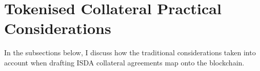 \section{Tokenised Collateral Practical Considerations}
\label{sec:practical_considerations}
In the subsections below, I discuss how the traditional considerations taken into account when drafting ISDA collateral agreements map onto the blockchain.